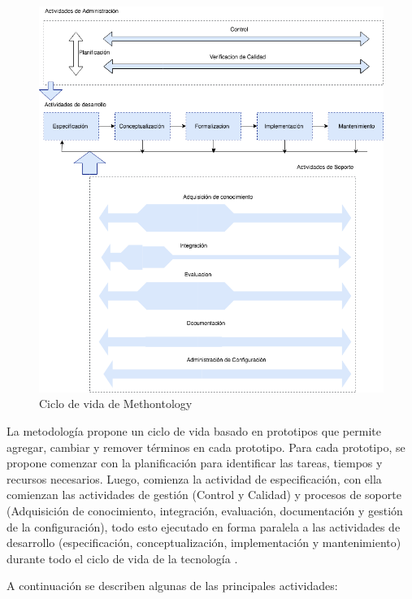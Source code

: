 \begin{figure}[h!]
    \centering
    \includegraphics[width=150mm]{figuras/Diagramas-MethontologyProcess}
    \caption{Ciclo de vida de Methontology\cite{Corcho2003BuildingLO}}
    \label{img:methontology}
    \end{figure}
    
    
La metodología propone un ciclo de vida basado en prototipos que permite agregar, cambiar y remover términos en cada prototipo. Para cada prototipo, se propone comenzar con la planificación para identificar las tareas, tiempos y recursos necesarios. Luego, comienza la actividad de especificación, con ella comienzan las actividades de gestión (Control y Calidad) y procesos de soporte (Adquisición de conocimiento, integración, evaluación, documentación y gestión de la configuración), todo esto ejecutado en forma paralela a las actividades de desarrollo (especificación, conceptualización, implementación y mantenimiento) durante todo el ciclo de vida de la tecnología \cite{fernandez1997methontology}.
 
A continuación se describen algunas de las principales actividades:

